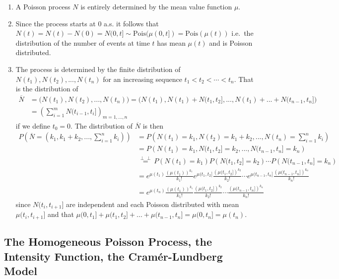 \documentclass[a4paper,12pt,openany]{book}
\providecommand{\tightlist}{%
 \setlength{\itemsep}{0pt}\setlength{\parskip}{0pt}}
\begin{document}
\begin{enumerate}
\def\labelenumi{(\arabic{enumi})}
\tightlist
\item
  A Poisson process \(N\) is entirely determined by the mean value function \(\mu\).
\item
  Since the process starts at 0 a.s. it follows that \(N(t)=N(t)-N(0)=N(0,t]\sim \text{Pois}(\mu(0,t])=\text{Pois}(\mu(t))\) i.e.~the distribution of the number of events at time \(t\) has mean \(\mu(t)\) and is Poisson distributed.
\item
  The process is determined by the finite distribution of \(N(t_1),N(t_2),...,N(t_n)\) for an increasing sequence \(t_1<t_2<\cdots <t_n\). That is the distribution of
  \begin{align*}
    \overline{N}&=\Big(N(t_1),N(t_2),...,N(t_n)\Big)=\Big(N(t_1),N(t_1)+N(t_1,t_2],...,N(t_1)+...+N(t_{n-1},t_n]\Big)\\
    &=\left(\sum_{i=1}^{m}N(t_{i-1},t_{i}]\right)_{m=1,...,n}
    \end{align*}
  if we define \(t_0=0\). The distribution of \(\overline{N}\) is then
  \begin{align*}
    P\left(\overline{N}=(k_1,k_1+k_2,...,\sum_{i=1}^nk_i)\right)&=P\left(N(t_1)=k_1,N(t_2)=k_1+k_2,...,N(t_n)=\sum_{i=1}^nk_i\right)\\
    &=P\left(N(t_1)=k_1,N(t_1,t_2]=k_2,...,N(t_{n-1},t_n]=k_n\right)\\
    &\stackrel{\perp \!\!\! \perp}{=}P\left(N(t_1)=k_1\right)P\left(N(t_1,t_2]=k_2\right)\cdots P\left(N(t_{n-1},t_n]=k_n\right)\\
    &=e^{\mu(t_1)}\frac{\left(\mu(t_1)\right)^{k_1}}{k_1!}e^{\mu(t_1,t_2]}\frac{\left(\mu(t_1,t_2]\right)^{k_2}}{k_2!}\cdots e^{\mu(t_{n-1},t_n]}\frac{\left(\mu(t_{n-1},t_n]\right)^{k_n}}{k_n!}\\
    &=e^{\mu(t_n)}\frac{\left(\mu(t_1)\right)^{k_1}}{k_1!}\frac{\left(\mu(t_1,t_2]\right)^{k_2}}{k_2!}\cdots \frac{\left(\mu(t_{n-1},t_n]\right)^{k_n}}{k_n!}
    \end{align*}
  since \(N(t_i,t_{i+1}]\) are independent and each Poisson distributed with mean \(\mu(t_i,t_{i+1}]\) and that \(\mu(0,t_1]+\mu(t_1,t_2]+...+\mu(t_{n-1},t_n]=\mu(0,t_n]=\mu(t_n)\).
\end{enumerate}

\hypertarget{the-homogeneous-poisson-process-the-intensity-function-the-cramuxe9r-lundberg-model}{%
\subsection{The Homogeneous Poisson Process, the Intensity Function, the Cramér-Lundberg Model}\label{the-homogeneous-poisson-process-the-intensity-function-the-cramuxe9r-lundberg-model}}
\end{document}
